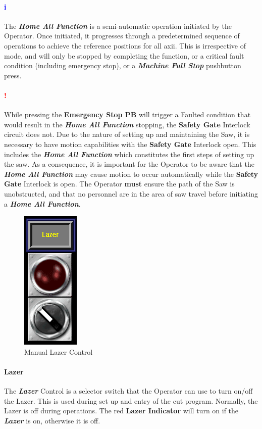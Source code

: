 \paragraph*{\textbf{\LARGE \textcolor{blue}{i}}}The \textbf{\textit{Home All Function}} is a semi-automatic operation initiated by the Operator. Once initiated, it progresses through a predetermined sequence of operations to achieve the reference positions for all axii. This is irrespective of mode, and will only be stopped by completing the function, or a critical fault condition (including emergency stop), or a \textbf{\textit{Machine Full Stop}} pushbutton press.
\paragraph*{\textbf{{\LARGE \textcolor{red}{!}}}} While pressing the \textbf{Emergency Stop PB} will trigger a Faulted condition that would result in the \textbf{\textit{Home All Function}} stopping, the \textbf{Safety Gate} Interlock circuit does not. Due to the nature of setting up and maintaining the Saw, it is necessary to have motion capabilities with the \textbf{Safety Gate} Interlock open. This includes the \textbf{\textit{Home All Function}} which constitutes the first steps of setting up the saw. As a consequence, it is important for the Operator to be aware that the \textbf{\textit{Home All Function}} may cause motion to occur automatically while the \textbf{Safety Gate} Interlock is open. The Operator \textbf{must} ensure the path of the Saw is unobstructed, and that no personnel are in the area of saw travel before initiating a \textbf{\textit{Home All Function}}.
\pagebreak
\begin{figure}
	\centering
	\includegraphics[width=.2\linewidth]{screen-captures/manual-lazer}
	\caption{Manual Lazer Control}
	\label{fig:manual-lazer}
\end{figure}
\paragraph*{Lazer} The \textbf{\textit{Lazer}} Control is a selector switch that the Operator can use to turn on/off the Lazer. This is used during set up and entry of the cut program. Normally, the Lazer is off during operations. The red \textbf{Lazer Indicator} will turn on if the \textbf{\textit{Lazer}} is on, otherwise it is off.
